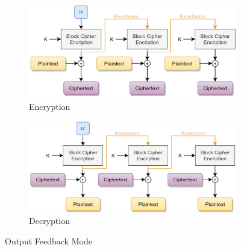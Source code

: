 \begin{figure}[H]
    \centering
    \begin{subfigure}[b]{0.48\textwidth}
    \includegraphics[width=\textwidth]{image/ofbenc.png}
    \caption{Encryption}
    \label{fig:ofbenc}
    \end{subfigure}\quad
    \begin{subfigure}[b]{0.48\textwidth}
    \includegraphics[width=\textwidth]{image/ofbdec.png}
    \caption{Decryption}
    \label{fig:ofbdec}
    \end{subfigure}
    \caption{Output Feedback Mode}
\end{figure}
